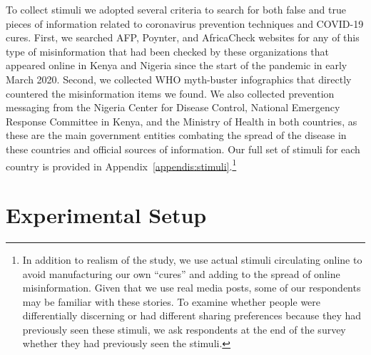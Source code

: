 \documentclass[letterpaper, 12pt, parskip=full,DIV=10]{scrartcl}
\begin{document}
To collect stimuli we adopted several criteria to search for both false and true pieces of information related to coronavirus prevention techniques and COVID-19 cures. First, we searched AFP, Poynter, and AfricaCheck websites for any of this type of misinformation that had been checked by these organizations that appeared online in Kenya and Nigeria since the start of the pandemic in early March 2020. Second, we collected WHO myth-buster infographics that directly countered the misinformation items we found. We also collected prevention messaging from the Nigeria Center for Disease Control, National Emergency Response Committee in Kenya, and the Ministry of Health in both countries, as these are the main government entities combating the spread of the disease in these countries and official sources of information. Our full set of stimuli for each country is provided in Appendix~\ref{appendis:stimuli}.\footnote{In addition to realism of the study, we use actual stimuli circulating online to avoid manufacturing our own ``cures'' and adding to the spread of online misinformation. Given that we use real media posts, some of our respondents may be familiar with these stories. To examine whether people were differentially discerning \citep{nyhan2020facts} or had different sharing preferences because they had previously seen these stimuli, we ask respondents at the end of the survey whether they had previously seen the stimuli.}








\FloatBarrier
\section{Experimental Setup}
\end{document}
